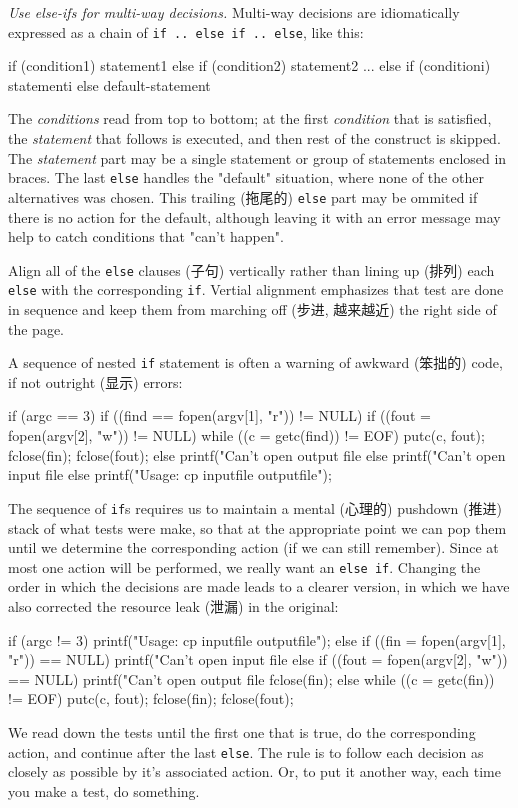 \emph{Use else-ifs for multi-way decisions.} Multi-way decisions are
idiomatically expressed as a chain of \verb'if .. else if .. else', like this:
\begin{wellcode}
    if (condition1)
        statement1
    else if (condition2)
        statement2
    ...
    else if (conditioni)
        statementi
    else 
        default-statement
\end{wellcode}
The \textit{conditions} read from top to bottom; at the first
\textit{condition} that is satisfied, the \textit{statement} that follows
is executed, and then rest of the construct is skipped. The
\textit{statement} part may be a single statement or group of statements
enclosed in braces. The last \verb'else' handles the "default" situation,
where none of the other alternatives was chosen. This trailing (拖尾的)
\verb'else' part may be ommited if there is no action for the default,
although leaving it with an error message may help to catch conditions that
"can't happen".

Align all of the \verb'else' clauses (子句) vertically rather than lining
up (排列) each \verb'else' with the corresponding \verb'if'. Vertial
alignment emphasizes that test are done in sequence and keep them from
marching off (步进, 越来越近) the right side of the page.

A sequence of nested \verb'if' statement is often a warning of
awkward (笨拙的) code, if not outright (显示) errors:
\begin{badcode}
    if (argc == 3)
        if ((find == fopen(argv[1], "r")) != NULL)
            if ((fout = fopen(argv[2], "w")) != NULL) {
                while ((c = getc(find)) != EOF)
                    putc(c, fout);
                fclose(fin); fclose(fout);
            } else 
                printf("Can't open output file %
        else 
            printf("Can't open input file %
    else 
        printf("Usage: cp inputfile outputfile\n");
\end{badcode}
The sequence of \verb'if's requires us to maintain a mental (心理的)
pushdown (推进) stack of what tests were make, so that at the appropriate
point we can pop them until we determine the corresponding action (if we
can still remember). Since at most one action will be performed, we really
want an \verb'else if'. Changing the order in which the decisions are made
leads to a clearer version, in which we have also corrected the resource
leak (泄漏) in the original:
\begin{wellcode}
    if (argc != 3)
        printf("Usage: cp inputfile outputfile\n");
    else if ((fin = fopen(argv[1], "r")) == NULL)
        printf("Can't open input file %
    else if ((fout = fopen(argv[2], "w")) == NULL) {
        printf("Can't open output file %
        fclose(fin);
    } else {
        while ((c = getc(fin)) != EOF)
            putc(c, fout);
        fclose(fin);
        fclose(fout);
    }
\end{wellcode}
We read down the tests until the first one that is true, do the
corresponding action, and continue after the last \verb'else'. The rule is
to follow each decision as closely as possible by it's associated action.
Or, to put it another way, each time you make a test, do something.

